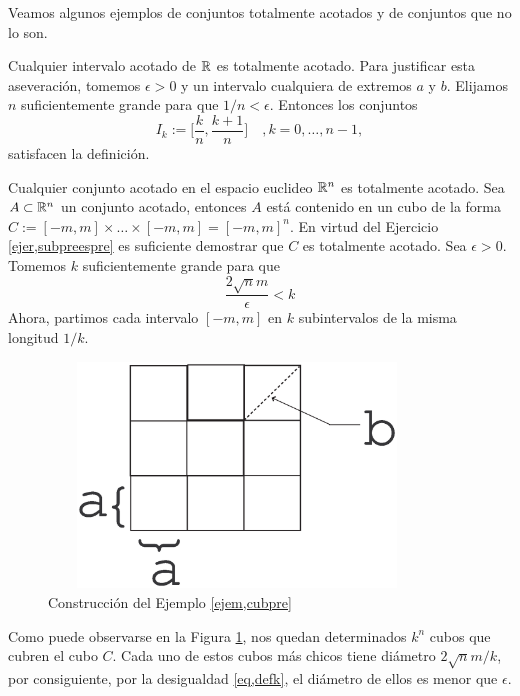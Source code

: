 Veamos algunos ejemplos de conjuntos totalmente acotados y de
conjuntos que no lo son.

\begin{ejemplo} Cualquier intervalo acotado de $\rr$ es
totalmente acotado. Para justificar esta aseveraci\'on, tomemos
$\epsilon>0$ y un intervalo cualquiera de extremos $a$ y $b$.
Elijamos $n$ suficientemente grande para que $1/n<\epsilon$.
Entonces los conjuntos
\[
	I_k:=\Big[\frac{k}{n},\frac{k+1}{n}\Big]\quad ,k=0,\ldots,n-1,
\]
satisfacen la definici\'on.
\end{ejemplo}

\begin{ejemplo}\label{ejem,cubpre} Cualquier conjunto  acotado en el
espacio euclideo $\rr^n$ es totalmente acotado. Sea
$A\subset\rr^n$ un conjunto acotado, entonces $A$  est\'a
contenido en un cubo de la forma $C:=[-m,m]\times\dots\times
[-m,m]=[-m,m]^n$. En virtud del Ejercicio \vref{ejer,subpreespre}
es suficiente demostrar que $C$ es totalmente acotado. Sea
$\epsilon>0$. Tomemos $k$ suficientemente grande para que
\begin{equation}\label{eq,defk}
	\frac{2\sqrt{n}m}{\epsilon}<k
\end{equation}
Ahora, partimos cada intervalo $[-m,m]$ en $k$ subintervalos de la
misma longitud $1/k$.

\begin{figure}[h]
\begin{center}
	\includegraphics[height=6cm, width=10cm]{cubpre.eps}
	\caption{Construcci\'on del Ejemplo
	\ref{ejem,cubpre}}\label{fig,cubpre}
\end{center}
\end{figure}

Como puede observarse en la Figura \ref{fig,cubpre}, nos quedan
determinados $k^n$ cubos que cubren el cubo $C$. Cada uno de estos
cubos m\'as chicos tiene di\'ametro $2\sqrt{n}m/k$, por
consiguiente, por la desigualdad \ref{eq,defk}, el di\'ametro de
ellos es menor que $\epsilon$.
\end{ejemplo}

